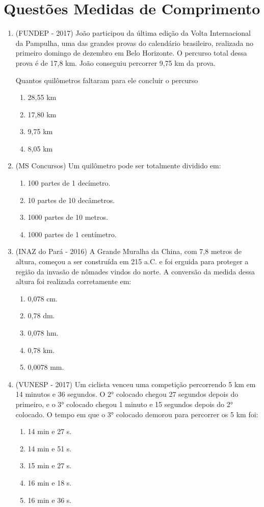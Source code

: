 \section{Questões Medidas de Comprimento}
\begin{enumerate}
 \item (FUNDEP - 2017) João participou da última edição da Volta Internacional da Pampulha, uma das grandes provas do calendário brasileiro, realizada no primeiro domingo de dezembro em Belo Horizonte. O percurso total dessa prova é de 17,8 km. João conseguiu percorrer 9,75 km da prova.

Quantos quilômetros faltaram para ele concluir o percurso
 \begin{enumerate}
 \item 28,55 km
 \item 17,80 km
 \item 9,75 km
 \item 8,05 km
\end{enumerate}

\item (MS Concursos) Um quilômetro pode ser totalmente dividido em:  
\begin{enumerate}
 \item 100 partes de 1 decímetro.
 \item 10 partes de 10 decâmetros.
 \item 1000 partes de 10 metros.
 \item 1000 partes de 1 centímetro.
\end{enumerate}

\item (INAZ do Pará - 2016) A Grande Muralha da China, com 7,8 metros de altura, começou a ser construída em 215 a.C. e foi erguida para proteger a região da invasão de nômades vindos do norte. A conversão da medida dessa altura foi realizada corretamente em:
\begin{enumerate}
 \item 0,078 cm.
 \item 0,78 dm.
 \item 0,078 hm.
 \item 0,78 km.
 \item 0,0078 mm.
\end{enumerate}

\item (VUNESP - 2017) Um ciclista venceu uma competição percorrendo 5 km em 14 minutos e 36 segundos. O 2° colocado chegou 27 segundos depois do primeiro, e o 3° colocado chegou 1 minuto e 15 segundos depois do 2° colocado. O tempo em que o 3° colocado demorou para percorrer os 5 km foi:
\begin{enumerate}
 \item 14 min e 27 s.
 \item 14 min e 51 s.
 \item 15 min e 27 s.
 \item 16 min e 18 s.
 \item 16 min e 36 s.
\end{enumerate}


\end{enumerate}
